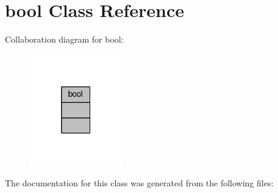\hypertarget{classbool}{}\section{bool Class Reference}
\label{classbool}


Collaboration diagram for bool\+:\nopagebreak
\begin{figure}[H]
\begin{center}
\leavevmode
\includegraphics[width=115pt]{classbool__coll__graph}
\end{center}
\end{figure}


The documentation for this class was generated from the following files\+: